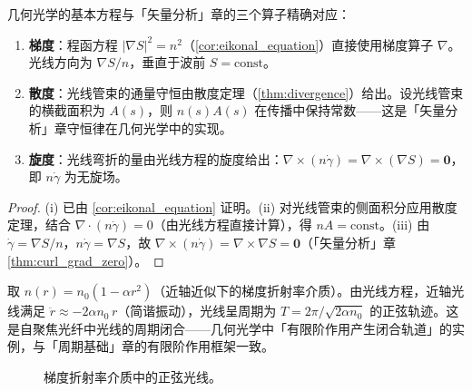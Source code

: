 \begin{property}\label{prop:geometric_optics_interface}
几何光学的基本方程与「矢量分析」章的三个算子精确对应：
\begin{enumerate}[label=(\roman*)]
    \item \textbf{梯度}：程函方程 $|\nabla S|^2 = n^2$（\cref{cor:eikonal_equation}）直接使用梯度算子 $\nabla$。光线方向为 $\nabla S/n$，垂直于波前 $S=\text{const}$。
    \item \textbf{散度}：光线管束的通量守恒由散度定理（\cref{thm:divergence}）给出。设光线管束的横截面积为 $A(s)$，则 $n(s)A(s)$ 在传播中保持常数——这是「矢量分析」章守恒律在几何光学中的实现。
    \item \textbf{旋度}：光线弯折的量由光线方程的旋度给出：$\nabla\times(n\dot\gamma) = \nabla\times(\nabla S) = \mathbf{0}$，即 $n\dot\gamma$ 为无旋场。
\end{enumerate}
\end{property}

\begin{proof}
(i) 已由 \cref{cor:eikonal_equation} 证明。(ii) 对光线管束的侧面积分应用散度定理，结合 $\nabla\cdot(n\dot\gamma) = 0$（由光线方程直接计算），得 $nA = \text{const}$。(iii) 由 $\dot\gamma = \nabla S/n$，$n\dot\gamma = \nabla S$，故 $\nabla\times(n\dot\gamma) = \nabla\times\nabla S = \mathbf{0}$（「矢量分析」章 \cref{thm:curl_grad_zero}）。
\end{proof}

\begin{example}[球面梯度介质中的光线]\label{ex:graded_index_ray}
取 $n(r) = n_0(1 - \alpha r^2)$（近轴近似下的梯度折射率介质）。由光线方程，近轴光线满足 $\ddot{r} \approx -2\alpha n_0\,r$（简谐振动），光线呈周期为 $T = 2\pi/\sqrt{2\alpha n_0}$ 的正弦轨迹。这是自聚焦光纤中光线的周期闭合——几何光学中「有限阶作用产生闭合轨道」的实例，与「周期基础」章的有限阶作用框架一致。
\end{example}

\begin{figure}[htbp]
\centering
{}
\caption{梯度折射率介质中的正弦光线。}
\label{fig:graded_index_ray}
\end{figure}


